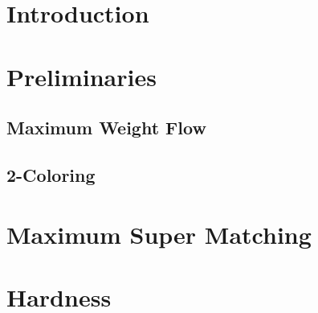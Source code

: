 \begin{abstract}

\end{abstract}

\section{Introduction}


\section{Preliminaries}
	\subsection{Maximum Weight Flow}
	
	\subsection{2-Coloring}
	

\section{\FIXEDCARPOOL{}}


\section{\UWCARPOOL{}}


\section{\UCCARPOOL{}}


\section{Maximum Super Matching}


\section{\CARPOOL{}}


\section{Hardness}


% 